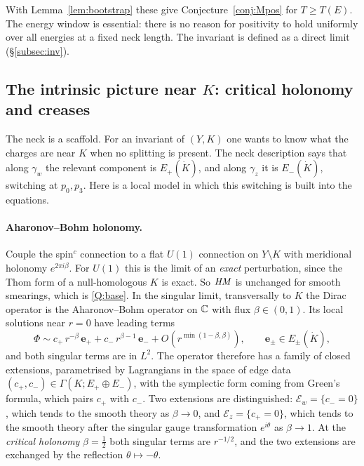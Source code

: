 With Lemma~\ref{lem:bootstrap} these give Conjecture~\ref{conj:Mpos} for $T\ge T(E)$.  The energy window is essential:
there is no reason for positivity to hold uniformly over all energies at a fixed neck length.  The invariant is defined
as a direct limit (\S\ref{subsec:inv}).

\subsection{The intrinsic picture near $K$: critical holonomy and creases}\label{subsec:edge}
The neck is a scaffold.  For an invariant of $(Y,K)$ one wants to know what the charges are near $K$ when no splitting
is present.  The neck description says that along $\gamma_w$ the relevant component is $E_+(\dot K)$, and along $\gamma_z$ it is
$E_-(\dot K)$, switching at $p_0,p_3$.  Here is a local model in which this switching is built into the equations.

\paragraph{Aharonov--Bohm holonomy.}  Couple the spin$^c$ connection to a flat $U(1)$ connection on $Y\setminus K$ with
meridional holonomy $e^{2\pi i\beta}$.  For $U(1)$ this is the limit of an \emph{exact} perturbation, since the Thom form of a
null-homologous $K$ is exact.  So $\mathit{HM}$ is unchanged for smooth smearings, which is \ref{Q:base}.  In the singular limit,
transversally to $K$ the Dirac operator is the Aharonov--Bohm operator on $\mathbb{C}$ with flux $\beta\in(0,1)$.  Its local
solutions near $r=0$ have leading terms
\[
\Phi\sim c_+\,r^{-\beta}\,\mathbf e_+ +c_-\,r^{\beta-1}\,\mathbf e_-+O(r^{\min(1-\beta,\beta)}),\qquad \mathbf e_\pm\in E_\pm(\dot K),
\]
and both singular terms are in $L^2$.  The operator therefore has a family of closed extensions, parametrised by
Lagrangians in the space of edge data $(c_+,c_-)\in\Gamma(K;E_+\oplus E_-)$, with the symplectic form coming from Green's formula,
which pairs $c_+$ with $c_-$.  Two extensions are distinguished: $\mathcal E_w=\{c_-=0\}$, which tends to the smooth theory as
$\beta\to0$, and $\mathcal E_z=\{c_+=0\}$, which tends to the smooth theory after the singular gauge transformation $e^{i\theta}$ as
$\beta\to1$.  At the \emph{critical holonomy} $\beta=\tfrac12$ both singular terms are $r^{-1/2}$, and the two extensions are
exchanged by the reflection $\theta\mapsto-\theta$.


